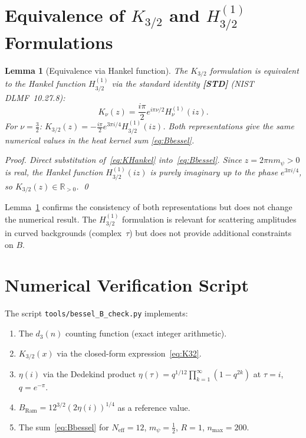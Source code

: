 \documentclass[12pt,a4paper]{article}
\newtheorem{lemma}[theorem]{Lemma}
\theoremstyle{definition}
\theoremstyle{remark}
\newcommand{\STD}{\textbf{[STD]}}
\begin{document}
\section{Equivalence of $K_{3/2}$ and $H_{3/2}^{(1)}$ Formulations}
\label{sec:hankel}

\begin{lemma}[Equivalence via Hankel function]
  \label{lem:hankel}
  The $K_{3/2}$ formulation is equivalent to the Hankel function $H_{3/2}^{(1)}$
  via the standard identity \STD{} (NIST DLMF~10.27.8):
  \begin{equation}
    K_\nu(z) = \frac{i\pi}{2}e^{i\pi\nu/2}H_\nu^{(1)}(iz).
    \label{eq:KHankel}
  \end{equation}
  For $\nu = \tfrac32$: $K_{3/2}(z) = -\tfrac{i\pi}{2}e^{3\pi i/4}H_{3/2}^{(1)}(iz)$.
  Both representations give the same numerical values in the heat kernel sum
  \eqref{eq:Bbessel}.
  \begin{proof}
    Direct substitution of~\eqref{eq:KHankel} into~\eqref{eq:Bbessel}.
    Since $z = 2\pi n m_\psi > 0$ is real, the Hankel function $H_{3/2}^{(1)}(iz)$
    is purely imaginary up to the phase $e^{3\pi i/4}$, so $K_{3/2}(z) \in \mathbb{R}_{>0}$.
    \qed
  \end{proof}
\end{lemma}

\begin{insightbox}
Lemma~\ref{lem:hankel} confirms the consistency of both representations but does
not change the numerical result.  The $H_{3/2}^{(1)}$ formulation is relevant
for scattering amplitudes in curved backgrounds (complex~$\tau$) but does not
provide additional constraints on $B$.
\end{insightbox}

\section{Numerical Verification Script}
\label{sec:script}

The script \texttt{tools/bessel\_B\_check.py} implements:
\begin{enumerate}
  \item The $d_3(n)$ counting function (exact integer arithmetic).
  \item $K_{3/2}(x)$ via the closed-form expression~\eqref{eq:K32}.
  \item $\eta(i)$ via the Dedekind product $\eta(\tau) = q^{1/12}\prod_{k=1}^\infty(1-q^{2k})$
        at $\tau=i$, $q = e^{-\pi}$.
  \item $B_{\mathrm{Ram}} = 12^{3/2}(2\eta(i))^{1/4}$ as a reference value.
  \item The sum~\eqref{eq:Bbessel} for $N_{\mathrm{eff}}=12$, $m_\psi=\tfrac12$,
        $R=1$, $n_{\max}=200$.
\end{enumerate}
\end{document}
